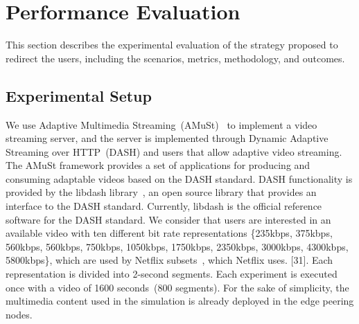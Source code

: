 \section{Performance Evaluation}
\label{sec:results}

This section describes the experimental evaluation of the strategy proposed to redirect the users, including the scenarios, metrics, methodology, and outcomes.
 
%

\subsection{Experimental Setup}


We use Adaptive Multimedia Streaming~(AMuSt)~\cite{kreuzberger2016amust} to implement a video streaming server, and the server is implemented through Dynamic Adaptive Streaming over HTTP~(DASH) and users that allow adaptive video streaming. The AMuSt framework provides a set of applications for producing and consuming adaptable videos based on the DASH standard. DASH functionality is provided by the libdash library~\cite{mueller2013ICMEW}, an open source library that provides an interface to the DASH standard. Currently, libdash is the official reference software for the DASH standard. We consider that users are interested in an available video with ten different bit rate representations \{235kbps, 375kbps, 560kbps, 560kbps, 750kbps, 1050kbps, 1750kbps, 2350kbps, 3000kbps, 4300kbps, 5800kbps\}, which are used by Netflix subsets~\cite{netflix:representation}, which Netflix uses. [31]. Each representation is divided into 2-second segments. Each experiment is executed once with a video of 1600 seconds~(800 segments). 
For the sake of simplicity, the multimedia content used in the simulation is already deployed in the edge peering nodes. 

